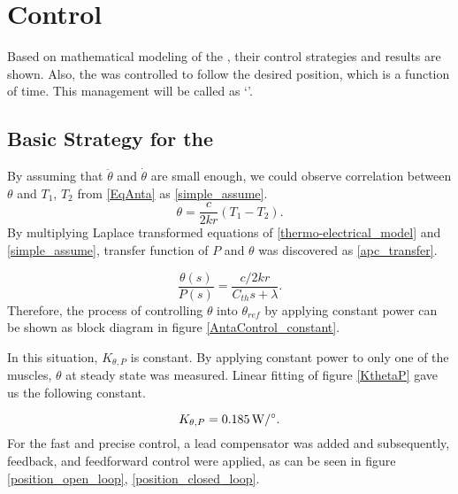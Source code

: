 \section{Control}
Based on mathematical modeling of the \scpsnospace, their control strategies and results are shown. Also, the \anta was controlled to follow the desired position, which is a function of time. This management will be called as `\apcnospace'.

\subsection{Basic Strategy for the \APC}
By assuming that $\ddot{\theta}$ and $\dot{\theta}$ are small enough, we could observe correlation between $\theta$ and $T_{1}$, $T_{2}$ from \eqref{EqAnta} as \eqref{simple_assume}.
\begin{equation} \label{simple_assume}
\theta = \frac{c}{2kr}(T_{1}-T_{2}).
\end{equation}
By multiplying Laplace transformed equations of \eqref{thermo-electrical_model} and \eqref{simple_assume}, transfer function of $P$ and $\theta$ was discovered as \eqref{apc_transfer}.

\begin{equation} \label{apc_transfer}
\frac{\theta(s)}{P(s)} = \frac{c/2kr}{C_{th}s+\lambda}.
\end{equation}
Therefore, the process of controlling $\theta$ into $\theta_{ref}$ by applying constant power can be shown as block diagram in figure \ref{AntaControl_constant}. 

In this situation, $K_{\theta,P}$ is constant. By applying constant power to only one of the muscles, $\theta$ at steady state was measured. Linear fitting of figure \ref{KthetaP} gave us the following constant.

\begin{equation}
K_{\theta,P} = \SI{0.185}{\watt\per\degree}. \notag
\end{equation}
For the fast and precise control, a lead compensator was added and subsequently, feedback, and feedforward control were applied, as can be seen in figure \ref{position_open_loop}, \ref{position_closed_loop}.

